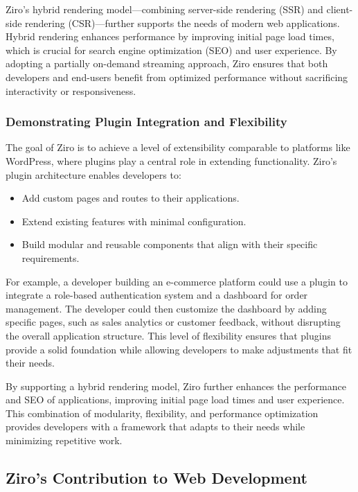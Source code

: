 Ziro’s hybrid rendering model—combining server-side rendering (SSR) and client-side rendering (CSR)—further supports the needs of modern web applications. Hybrid rendering enhances performance by improving initial page load times, which is crucial for search engine optimization (SEO) and user experience. By adopting a partially on-demand streaming approach, Ziro ensures that both developers and end-users benefit from optimized performance without sacrificing interactivity or responsiveness.

\subsubsection*{Demonstrating Plugin Integration and Flexibility}

The goal of Ziro is to achieve a level of extensibility comparable to platforms like WordPress, where plugins play a central role in extending functionality. Ziro’s plugin architecture enables developers to:

\begin{itemize}
	\item Add custom pages and routes to their applications.
	\item Extend existing features with minimal configuration.
	\item Build modular and reusable components that align with their specific requirements.
\end{itemize}


For example, a developer building an e-commerce platform could use a plugin to integrate a role-based authentication system and a dashboard for order management. The developer could then customize the dashboard by adding specific pages, such as sales analytics or customer feedback, without disrupting the overall application structure. This level of flexibility ensures that plugins provide a solid foundation while allowing developers to make adjustments that fit their needs.

By supporting a hybrid rendering model, Ziro further enhances the performance and SEO of applications, improving initial page load times and user experience. This combination of modularity, flexibility, and performance optimization provides developers with a framework that adapts to their needs while minimizing repetitive work.

\subsection{Ziro’s Contribution to Web Development}

